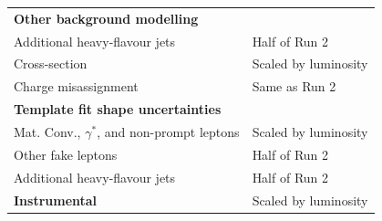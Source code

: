 \begin{table}[htbp]
\begin{tabular}{p{} p{}}
\multicolumn{2}{l}{\textbf{Other background modelling}} \\
Additional heavy-flavour jets & Half of Run 2 \\
Cross-section & Scaled by luminosity \\
Charge misassignment & Same as Run 2 \\
\midrule

\multicolumn{2}{l}{\textbf{Template fit shape uncertainties}} \\
Mat. Conv., $\gamma^{\ast}$, and non-prompt leptons & Scaled by luminosity \\
Other fake leptons & Half of Run 2 \\
Additional heavy-flavour jets & Half of Run 2 \\
\midrule

\textbf{Instrumental} & Scaled by luminosity \\
\bottomrule
\end{tabular}
\end{table}

